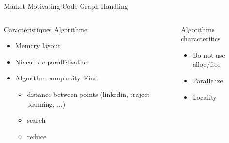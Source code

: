 %
\begin{Frame}{Market Motivating Code Graph Handling}
  \begin{columns}[t]
    \begin{column}{\HW} %
      \begin{block}{Caractéristiques Algorithme}
        \begin{itemize}
        \item Memory layout
        \item Niveau de parallélisation
        \item Algorithm complexity. Find 
          \begin{itemize}
          \item distance between points (linkedin, traject planning, ...)
          \item search
          \item reduce
          \end{itemize}
        \end{itemize}
      \end{block} 
    \end{column}
    
    \begin{column}{\HW} %
      \begin{block}{Algorithme characteritics}
        \begin{itemize}
        \item Do not use alloc/free
        \item Parallelize
        \item Locality
        \end{itemize}
      \end{block} 
    \end{column}
  \end{columns}  
\end{Frame}


